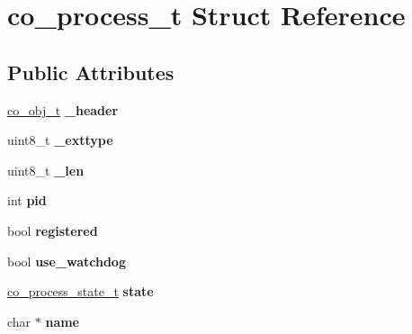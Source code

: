 \hypertarget{structco__process__t}{\section{co\-\_\-process\-\_\-t Struct Reference}
\label{structco__process__t}
}
\subsection*{Public Attributes}
\begin{DoxyCompactItemize}
\item 
\hypertarget{structco__process__t_a498c37443354b360d8af982467fa99f3}{\hyperlink{structco__obj__t}{co\-\_\-obj\-\_\-t} {\bfseries \-\_\-header}}\label{structco__process__t_a498c37443354b360d8af982467fa99f3}

\item 
\hypertarget{structco__process__t_ae59c7ea2da88b6ef67e4db865fc9515b}{uint8\-\_\-t {\bfseries \-\_\-exttype}}\label{structco__process__t_ae59c7ea2da88b6ef67e4db865fc9515b}

\item 
\hypertarget{structco__process__t_aac7e514517f5d27200141e65544585c8}{uint8\-\_\-t {\bfseries \-\_\-len}}\label{structco__process__t_aac7e514517f5d27200141e65544585c8}

\item 
\hypertarget{structco__process__t_a23ed7b90e7d7ed78eda3434aed55318c}{int {\bfseries pid}}\label{structco__process__t_a23ed7b90e7d7ed78eda3434aed55318c}

\item 
\hypertarget{structco__process__t_acc87aa46cf9ff28689abf1828b777682}{bool {\bfseries registered}}\label{structco__process__t_acc87aa46cf9ff28689abf1828b777682}

\item 
\hypertarget{structco__process__t_a83da7d301f6494aefc6b99554430397e}{bool {\bfseries use\-\_\-watchdog}}\label{structco__process__t_a83da7d301f6494aefc6b99554430397e}

\item 
\hypertarget{structco__process__t_ac332ad56c7321e1a1defe54b964fe327}{\hyperlink{process_8h_ad844b14a4717db2b1b1cbe65afb72db9}{co\-\_\-process\-\_\-state\-\_\-t} {\bfseries state}}\label{structco__process__t_ac332ad56c7321e1a1defe54b964fe327}

\item 
\hypertarget{structco__process__t_aea35e320f68d5bb2a505f0d5c35f30af}{char $\ast$ {\bfseries name}}\label{structco__process__t_aea35e320f68d5bb2a505f0d5c35f30af}


\end{DoxyCompactItemize}
